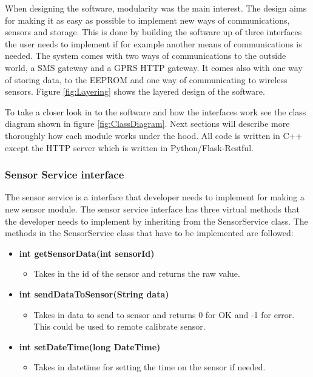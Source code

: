 When designing the software, modularity was the main interest. The design aims for making
it as easy as possible to implement new ways of communications, sensors and storage. This 
is done by building the software up of three interfaces the user needs to implement if for
example another means of communications is needed. The system comes with two ways of
communications to the outside world, a SMS gateway and a GPRS HTTP gateway. It comes also with one way of storing data, to the EEPROM and one way of communicating to wireless sensors. Figure \ref{fig:Layering} shows the layered design of the software. 

To take a closer look in to the software and how the interfaces work see the class diagram
shown in figure \ref{fig:ClassDiagram}. Next sections will describe more thoroughly how each 
module works under the hood. All code is written in C++ except the HTTP server which is 
written in Python/Flask-Restful.

\subsubsection{Sensor Service interface}
The sensor service is a interface that developer needs to implement for making a new
sensor module. The sensor service interface has three virtual methods that the developer
needs to implement by inheriting from the SensorService class. The methods in the 
SensorService class that have to be implemented are followed:

\begin{itemize}
	\item \textbf{int getSensorData(int sensorId)}
		\begin{itemize}
			\item Takes in the id of the sensor and returns the raw value.
		\end{itemize}
	\item \textbf{int sendDataToSensor(String data)}
		\begin{itemize}
			\item Takes in data to send to sensor and returns 0 for OK and -1 for error.
				  This could be used to remote calibrate sensor.
		\end{itemize}
	\item \textbf{int setDateTime(long DateTime)}
		\begin{itemize}
			\item Takes in datetime for setting the time on the sensor if needed.
		\end{itemize}
\end{itemize}



